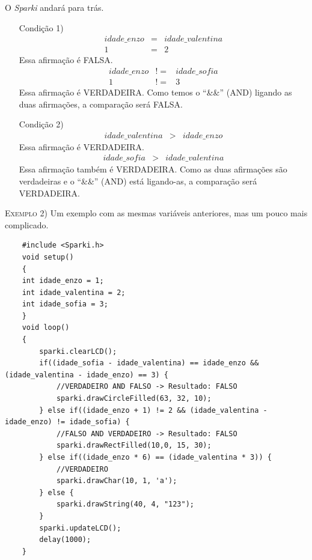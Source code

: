     O \textsl{Sparki} andará para trás.
    \begin{itemize}
        \item[Condição 1)]
        \begin{eqnarray}
        idade\_enzo & = & idade\_valentina\\
        1 & = & 2 \nonumber     \end{eqnarray}
        Essa afirmação é FALSA.
        \begin{eqnarray}
        idade\_enzo & != & idade\_sofia\\
        1 & != & 3 \nonumber
        \end{eqnarray}
        Essa afirmação é VERDADEIRA.
        Como temos o ``\&\&'' (AND) ligando as duas afirmações, a comparação será FALSA.
        \item[Condição 2)]
        \begin{eqnarray}
        idade\_valentina & > & idade\_enzo
        \end{eqnarray}
        Essa afirmação é VERDADEIRA.
        \begin{eqnarray}
        idade\_sofia & > & idade\_valentina
        \end{eqnarray}
        Essa afirmação também é VERDADEIRA. Como as duas afirmações são verdadeiras e o ``\&\&'' (AND) está ligando-as, a comparação será VERDADEIRA.
    \end{itemize} 
    
    \textsc{Exemplo 2)} Um exemplo com as mesmas variáveis anteriores, mas um pouco mais complicado.
    
    \begin{verbatim}
    #include <Sparki.h>
    void setup()
    {
    int idade_enzo = 1;
    int idade_valentina = 2;
    int idade_sofia = 3;
    }
    void loop()
    {
        sparki.clearLCD();
        if((idade_sofia - idade_valentina) == idade_enzo && (idade_valentina - idade_enzo) == 3) {
            //VERDADEIRO AND FALSO -> Resultado: FALSO
            sparki.drawCircleFilled(63, 32, 10);
        } else if((idade_enzo + 1) != 2 && (idade_valentina - idade_enzo) != idade_sofia) {
            //FALSO AND VERDADEIRO -> Resultado: FALSO
            sparki.drawRectFilled(10,0, 15, 30);
        } else if((idade_enzo * 6) == (idade_valentina * 3)) {
            //VERDADEIRO
            sparki.drawChar(10, 1, 'a');
        } else {
            sparki.drawString(40, 4, "123");
        } 
        sparki.updateLCD();
        delay(1000);
    }
    \end{verbatim}
    
